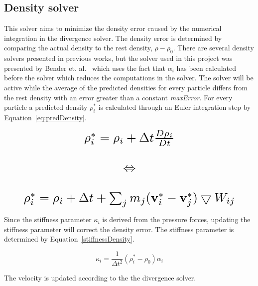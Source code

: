 \subsection{Density solver} \label{densitySolver}
    This solver aims to minimize the density error caused by the numerical integration in the divergence solver. The density error is determined by comparing the actual density to the rest density, $\rho - \rho_0$. There are several density solvers presented in previous works, but the solver used in this project was presented by Bender et. al.~\cite{bender} which uses the fact that $\alpha_i$ has been calculated before the solver which reduces the computations in the solver. The solver will be active while the average of the predicted densities for every particle differs from the rest density with an error greater than a constant \textit{maxError}. For every particle a predicted density $\rho_i^*$ is calculated through an Euler integration step by Equation~\ref{eq:predDensity}. 

    \begin{equation} \label{eq:predDensity}
        \resizebox{0.88\linewidth}{!}{$
        \begin{matrix}
        \rho_i^* = \rho_i + \Delta t \frac{D\rho_i}{Dt} \\ 
        \\
        \Leftrightarrow \\ 
        \\
        \rho_i^* = \rho_i + \Delta t + \sum_j m_j 
        (\textbf{v}_i^* - \textbf{v}_j^*) \bigtriangledown W_{ij}
        \end{matrix}
        $}
    \end{equation}

    Since the stiffness parameter $\kappa_i$ is derived from the pressure forces, updating the stiffness parameter will correct the density error. The stiffness parameter is determined by Equation~\ref{stiffnessDensity}.

    \begin{equation} \label{stiffnessDensity}
    \kappa_i = \frac{1}{\Delta t^2}(\rho_i^*-\rho_0)\alpha_i
    \end{equation}

    The velocity is updated according to the the divergence solver. %



